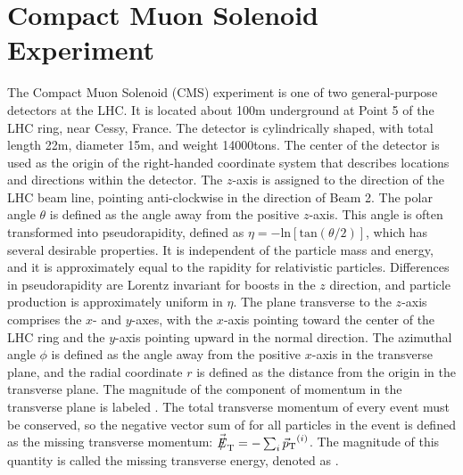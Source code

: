 \chapter{Compact Muon Solenoid Experiment
\label{ch:cmsexperiment}}
\setcounter{section}{-1}

The Compact Muon Solenoid (CMS) experiment is one of two general-purpose detectors at the LHC. It is located about 100\unit{m} underground at Point 5 of the LHC ring, near Cessy, France. The detector is cylindrically shaped, with total length 22\unit{m}, diameter 15\unit{m}, and weight 14000\unit{tons}. The center of the detector is used as the origin of the right-handed coordinate system that describes locations and directions within the detector. The $z$-axis is assigned to the direction of the LHC beam line, pointing anti-clockwise in the direction of Beam 2. The polar angle $\theta$ is defined as the angle away from the positive $z$-axis. This angle is often transformed into pseudorapidity, defined as $\eta = -\text{ln}[\text{tan}(\theta/2)]$, which has several desirable properties. It is independent of the particle mass and energy, and it is approximately equal to the rapidity for relativistic particles. Differences in pseudorapidity are Lorentz invariant for boosts in the $z$ direction, and particle production is approximately uniform in $\eta$. The plane transverse to the $z$-axis comprises the $x$- and $y$-axes, with the $x$-axis pointing toward the center of the LHC ring and the $y$-axis pointing upward in the normal direction. The azimuthal angle $\phi$ is defined as the angle away from the positive $x$-axis in the transverse plane, and the radial coordinate $r$ is defined as the distance from the origin in the transverse plane. The magnitude of the component of momentum in the transverse plane is labeled \pt. The total transverse momentum of every event must be conserved, so the negative vector sum of \vecpt for all particles in the event is defined as the missing transverse momentum: $\vecmet = - \sum_{i} \vecpt^{(i)}$. The magnitude of this quantity is called the missing transverse energy, denoted as \met.

